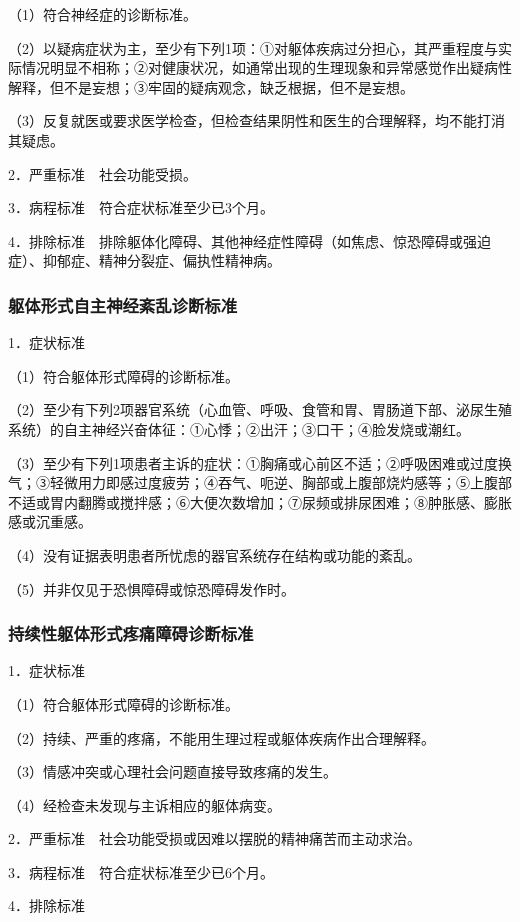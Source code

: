 （1）符合神经症的诊断标准。

（2）以疑病症状为主，至少有下列1项：①对躯体疾病过分担心，其严重程度与实际情况明显不相称；②对健康状况，如通常出现的生理现象和异常感觉作出疑病性解释，但不是妄想；③牢固的疑病观念，缺乏根据，但不是妄想。

（3）反复就医或要求医学检查，但检查结果阴性和医生的合理解释，均不能打消其疑虑。

2．严重标准　社会功能受损。

3．病程标准　符合症状标准至少已3个月。

4．排除标准　排除躯体化障碍、其他神经症性障碍（如焦虑、惊恐障碍或强迫症）、抑郁症、精神分裂症、偏执性精神病。

\subsubsection{躯体形式自主神经紊乱诊断标准}

1．症状标准

（1）符合躯体形式障碍的诊断标准。

（2）至少有下列2项器官系统（心血管、呼吸、食管和胃、胃肠道下部、泌尿生殖系统）的自主神经兴奋体征：①心悸；②出汗；③口干；④脸发烧或潮红。

（3）至少有下列1项患者主诉的症状：①胸痛或心前区不适；②呼吸困难或过度换气；③轻微用力即感过度疲劳；④吞气、呃逆、胸部或上腹部烧灼感等；⑤上腹部不适或胃内翻腾或搅拌感；⑥大便次数增加；⑦尿频或排尿困难；⑧肿胀感、膨胀感或沉重感。

（4）没有证据表明患者所忧虑的器官系统存在结构或功能的紊乱。

（5）并非仅见于恐惧障碍或惊恐障碍发作时。

\subsubsection{持续性躯体形式疼痛障碍诊断标准}

1．症状标准

（1）符合躯体形式障碍的诊断标准。

（2）持续、严重的疼痛，不能用生理过程或躯体疾病作出合理解释。

（3）情感冲突或心理社会问题直接导致疼痛的发生。

（4）经检查未发现与主诉相应的躯体病变。

2．严重标准　社会功能受损或因难以摆脱的精神痛苦而主动求治。

3．病程标准　符合症状标准至少已6个月。

4．排除标准

